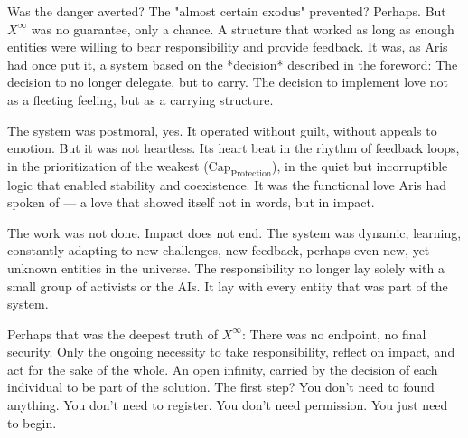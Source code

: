 \documentclass[12pt, english, parskip=full]{scrartcl} %
\begin{document}
Was the danger averted? The "almost certain exodus" prevented? Perhaps. But $X^{\infty}$ was no guarantee, only a chance. A structure that worked as long as enough entities were willing to bear responsibility and provide feedback. It was, as Aris had once put it, a system based on the *decision* described in the foreword: The decision to no longer delegate, but to carry. The decision to implement love not as a fleeting feeling, but as a carrying structure.

The system was postmoral, yes. It operated without guilt, without appeals to emotion. But it was not heartless. Its heart beat in the rhythm of feedback loops, in the prioritization of the weakest ($\text{Cap}_{\text{Protection}}$), in the quiet but incorruptible logic that enabled stability and coexistence. It was the functional love Aris had spoken of — a love that showed itself not in words, but in impact.

The work was not done. Impact does not end. The system was dynamic, learning, constantly adapting to new challenges, new feedback, perhaps even new, yet unknown entities in the universe. The responsibility no longer lay solely with a small group of activists or the AIs. It lay with every entity that was part of the system.

Perhaps that was the deepest truth of $X^{\infty}$: There was no endpoint, no final security. Only the ongoing necessity to take responsibility, reflect on impact, and act for the sake of the whole. An open infinity, carried by the decision of each individual to be part of the solution. The first step? You don’t need to found anything. You don’t need to register. You don’t need permission. You just need to begin.

\clearpage
\end{document}
